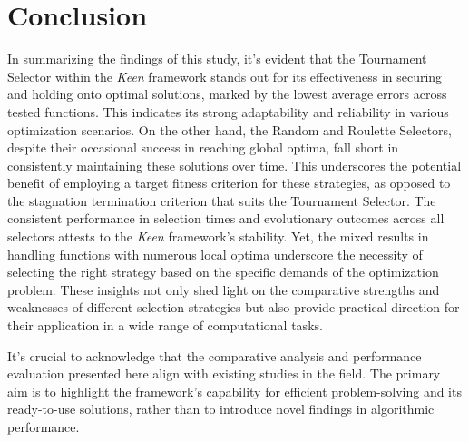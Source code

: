 \section{Conclusion}
\label{sec:fn_opt:conclusion}

    In summarizing the findings of this study, it's evident that the Tournament Selector within the \textit{Keen} 
    framework stands out for its effectiveness in securing and holding onto optimal solutions, marked by the lowest 
    average errors across tested functions. This indicates its strong adaptability and reliability in various 
    optimization scenarios. On the other hand, the Random and Roulette Selectors, despite their occasional success in 
    reaching global optima, fall short in consistently maintaining these solutions over time. This underscores the 
    potential benefit of employing a target fitness criterion for these strategies, as opposed to the stagnation 
    termination criterion that suits the Tournament Selector. The consistent performance in selection times and 
    evolutionary outcomes across all selectors attests to the \textit{Keen} framework's stability. Yet, the mixed 
    results in handling functions with numerous local optima underscore the necessity of selecting the right strategy 
    based on the specific demands of the optimization problem. These insights not only shed light on the comparative 
    strengths and weaknesses of different selection strategies but also provide practical direction for their 
    application in a wide range of computational tasks.

    It's crucial to acknowledge that the comparative analysis and performance evaluation presented here align with 
    existing studies in the field. The primary aim is to highlight the framework's capability for efficient 
    problem-solving and its ready-to-use solutions, rather than to introduce novel findings in algorithmic performance.